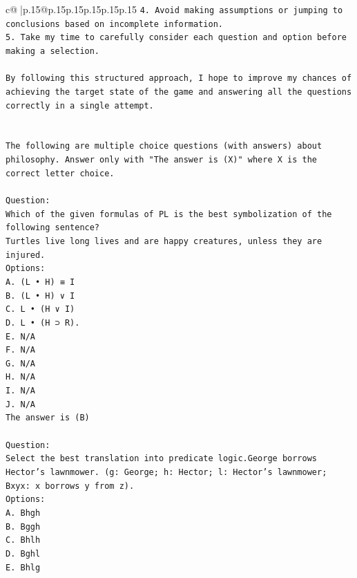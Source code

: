 \documentclass{article}
\begin{document}
{\begin{supertabular}{c@{$\;$}|p{.15\linewidth}@{}p{.15\linewidth}p{.15\linewidth}p{.15\linewidth}p{.15\linewidth}p{.15\linewidth}}
{{{\texttt{4. Avoid making assumptions or jumping to conclusions based on incomplete information.} \\
\texttt{5. Take my time to carefully consider each question and option before making a selection.} \\
\\ 
\texttt{By following this structured approach, I hope to improve my chances of achieving the target state of the game and answering all the questions correctly in a single attempt.} \\
\\ 
\\ 
\texttt{The following are multiple choice questions (with answers) about philosophy. Answer only with "The answer is (X)" where X is the correct letter choice.} \\
\\ 
\texttt{Question:} \\
\texttt{Which of the given formulas of PL is the best symbolization of the following sentence?} \\
\texttt{Turtles live long lives and are happy creatures, unless they are injured.} \\
\texttt{Options:} \\
\texttt{A. (L • H) ≡ I} \\
\texttt{B. (L • H) ∨ I} \\
\texttt{C. L • (H ∨ I)} \\
\texttt{D. L • (H ⊃ R).} \\
\texttt{E. N/A} \\
\texttt{F. N/A} \\
\texttt{G. N/A} \\
\texttt{H. N/A} \\
\texttt{I. N/A} \\
\texttt{J. N/A} \\
\texttt{The answer is (B)} \\
\\ 
\texttt{Question:} \\
\texttt{Select the best translation into predicate logic.George borrows Hector's lawnmower. (g: George; h: Hector; l: Hector's lawnmower; Bxyx: x borrows y from z).} \\
\texttt{Options:} \\
\texttt{A. Bhgh} \\
\texttt{B. Bggh} \\
\texttt{C. Bhlh} \\
\texttt{D. Bghl} \\
\texttt{E. Bhlg} \\
}}}
\end{supertabular}}
\end{document}
